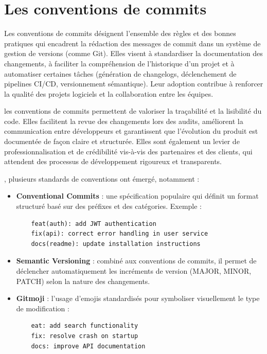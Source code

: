 \section{Les conventions de commits}

Les conventions de commits désignent l’ensemble des règles et des bonnes pratiques qui encadrent la rédaction des messages de commit dans un système de gestion de versions (comme Git). Elles visent à standardiser la documentation des changements, à faciliter la compréhension de l’historique d’un projet et à automatiser certaines tâches (génération de changelogs, déclenchement de pipelines CI/CD, versionnement sémantique). Leur adoption contribue à renforcer la qualité des projets logiciels et la collaboration entre les équipes.

les conventions de commits permettent de valoriser la traçabilité et la lisibilité du code. Elles facilitent la revue des changements lors des audits, améliorent la communication entre développeurs et garantissent que l’évolution du produit est documentée de façon claire et structurée. Elles sont également un levier de professionnalisation et de crédibilité vis-à-vis des partenaires et des clients, qui attendent des processus de développement rigoureux et transparents.

, plusieurs standards de conventions ont émergé, notamment :
\begin{itemize}
	\item \textbf{Conventional Commits} : une spécification populaire qui définit un format structuré basé sur des préfixes et des catégories. Exemple :
	      \begin{verbatim}
    feat(auth): add JWT authentication
    fix(api): correct error handling in user service
    docs(readme): update installation instructions
	      \end{verbatim}
	\item \textbf{Semantic Versioning} : combiné aux conventions de commits, il permet de déclencher automatiquement les incréments de version (MAJOR, MINOR, PATCH) selon la nature des changements.
	\item \textbf{Gitmoji} : l’usage d’emojis standardisés pour symboliser visuellement le type de modification :
	      \begin{verbatim}
    eat: add search functionality
    fix: resolve crash on startup
    docs: improve API documentation
	      \end{verbatim}
\end{itemize}

